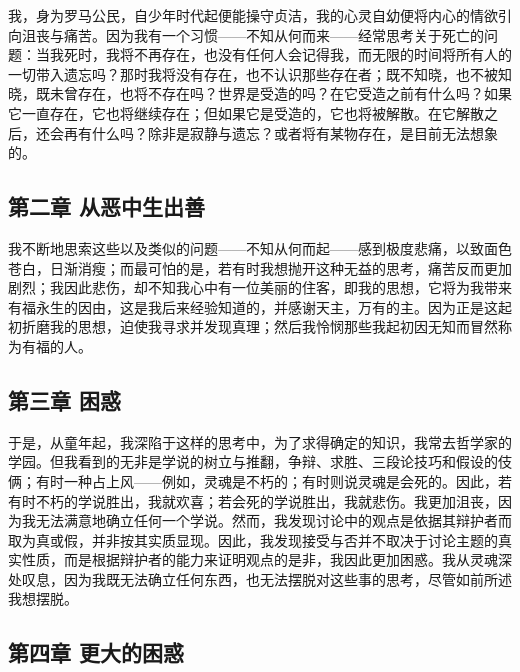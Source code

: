 我，身为罗马公民，自少年时代起便能操守贞洁，我的心灵自幼便将内心的情欲引向沮丧与痛苦。因为我有一个习惯——不知从何而来——经常思考关于死亡的问题：当我死时，我将不再存在，也没有任何人会记得我，而无限的时间将所有人的一切带入遗忘吗？那时我将没有存在，也不认识那些存在者；既不知晓，也不被知晓，既未曾存在，也将不存在吗？世界是受造的吗？在它受造之前有什么吗？如果它一直存在，它也将继续存在；但如果它是受造的，它也将被解散。在它解散之后，还会再有什么吗？除非是寂静与遗忘？或者将有某物存在，是目前无法想象的。\par


\subsection{第二章 从恶中生出善}

我不断地思索这些以及类似的问题——不知从何而起——感到极度悲痛，以致面色苍白，日渐消瘦；而最可怕的是，若有时我想抛开这种无益的思考，痛苦反而更加剧烈；我因此悲伤，却不知我心中有一位美丽的住客，即我的思想，它将为我带来有福永生的因由，这是我后来经验知道的，并感谢天主，万有的主。因为正是这起初折磨我的思想，迫使我寻求并发现真理；然后我怜悯那些我起初因无知而冒然称为有福的人。\par


\subsection{第三章 困惑}

于是，从童年起，我深陷于这样的思考中，为了求得确定的知识，我常去哲学家的学园。但我看到的无非是学说的树立与推翻，争辩、求胜、三段论技巧和假设的伎俩；有时一种占上风——例如，灵魂是不朽的；有时则说灵魂是会死的。因此，若有时不朽的学说胜出，我就欢喜；若会死的学说胜出，我就悲伤。我更加沮丧，因为我无法满意地确立任何一个学说。然而，我发现讨论中的观点是依据其辩护者而取为真或假，并非按其实质显现。因此，我发现接受与否并不取决于讨论主题的真实性质，而是根据辩护者的能力来证明观点的是非，我因此更加困惑。我从灵魂深处叹息，因为我既无法确立任何东西，也无法摆脱对这些事的思考，尽管如前所述我想摆脱。\par


\subsection{第四章 更大的困惑}

